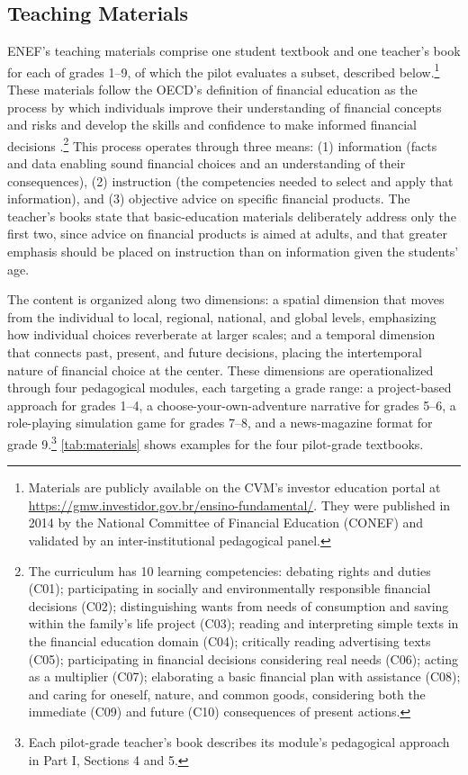 \subsection{Teaching Materials}\label{subsec:materials}

ENEF's teaching materials comprise one student textbook and one teacher's book for each of grades 1--9, of which the pilot evaluates a subset, described below.\footnote{Materials are publicly available on the CVM's investor education portal at \url{https://gmw.investidor.gov.br/ensino-fundamental/}. They were published in 2014 by the National Committee of Financial Education (CONEF) and validated by an inter-institutional pedagogical panel.} These materials follow the OECD's definition of financial education as the process by which individuals improve their understanding of financial concepts and risks and develop the skills and confidence to make informed financial decisions \citep{OECD2005}.\footnote{The curriculum has 10 learning competencies: debating rights and duties (C01); participating in socially and environmentally responsible financial decisions (C02); distinguishing wants from needs of consumption and saving within the family's life project (C03); reading and interpreting simple texts in the financial education domain (C04); critically reading advertising texts (C05); participating in financial decisions considering real needs (C06); acting as a multiplier (C07); elaborating a basic financial plan with assistance (C08); and caring for oneself, nature, and common goods, considering both the immediate (C09) and future (C10) consequences of present actions.} This process operates through three means: (1) information (facts and data enabling sound financial choices and an understanding of their consequences), (2) instruction (the competencies needed to select and apply that information), and (3) objective advice on specific financial products. The teacher's books state that basic-education materials deliberately address only the first two, since advice on financial products is aimed at adults, and that greater emphasis should be placed on instruction than on information given the students' age.

The content is organized along two dimensions: a spatial dimension that moves from the individual to local, regional, national, and global levels, emphasizing how individual choices reverberate at larger scales; and a temporal dimension that connects past, present, and future decisions, placing the intertemporal nature of financial choice at the center. These dimensions are operationalized through four pedagogical modules, each targeting a grade range: a project-based approach for grades 1--4, a choose-your-own-adventure narrative for grades 5--6, a role-playing simulation game for grades 7--8, and a news-magazine format for grade 9.\footnote{Each pilot-grade teacher's book describes its module's pedagogical approach in Part I, Sections 4 and 5.} \autoref{tab:materials} shows examples for the four pilot-grade textbooks.

